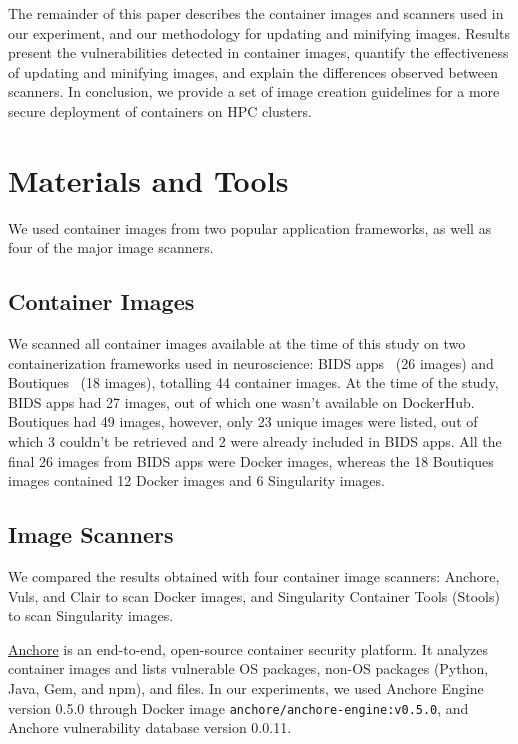 \documentclass[a4paper,num-refs]{oup-contemporary}
\begin{document}
The remainder of this paper 
describes the container images and scanners used in our experiment, and our methodology for updating and minifying images.
Results present the vulnerabilities detected in container
images, quantify the effectiveness of updating and minifying images, and
explain the differences observed between scanners. In conclusion, we
provide a set of image creation guidelines for a more secure deployment of
containers on HPC clusters.

\section{Materials and Tools}

We used container
images from two popular application frameworks, as well as
four of the major image scanners.

\subsection{Container Images}

We scanned all container images available at the time of this study on two containerization frameworks
used in neuroscience: BIDS
apps~\cite{gorgolewski2017bids} (26 images) and Boutiques~\cite{glatard2018boutiques} (18 images),
totalling
44 container images. At the time of the study, BIDS apps had 27 images,
out of which one wasn't available on DockerHub. Boutiques had 49 images,
however, only 23 unique images were listed, out of which 3 couldn't be retrieved and 2
were already included in BIDS apps. All the final 26 images
from BIDS apps were Docker images, whereas the 18 Boutiques images contained 12 Docker images
and 6 Singularity images.

\subsection{Image Scanners}

We compared the results obtained with four container image scanners: Anchore, Vuls, and
Clair to scan Docker images, and Singularity Container Tools
(Stools) to scan Singularity images. 

\href{https://github.com/anchore/anchore-engine}{Anchore} is an end-to-end, open-source container security platform. It
analyzes container images and lists vulnerable OS
packages, non-OS packages (Python, Java, Gem, and npm), and files.
In our experiments, we used Anchore Engine version 0.5.0 through Docker image \texttt{anchore/anchore-engine:v0.5.0}, and
Anchore vulnerability database version 0.0.11.
\end{document}
